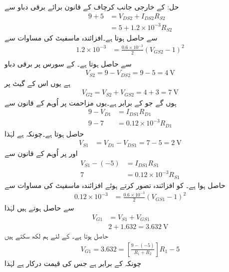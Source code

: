 حل: کے خارجی جانب کرچاف کے قانون برائے برقی دباو سے
\begin{align*}
9+5 &=V_{DS2}+I_{DS2}R_{S2}\\
&=5+1.2 \times 10^{-3} R_{S2}
\end{align*}
سے  حاصل ہوتا ہے۔افزائندہ ماسفیٹ کی مساوات سے 
\begin{align*}
1.2 \times 10^{-3}&=\frac{0.6 \times 10^{-3}}{2} \left (V_{GS2}-1 \right)^2\\
\end{align*}
سے  حاصل ہوتا ہے۔ کے سورس پر برقی دباو
\begin{align*}
V_{S2}=9-V_{DS2}=9-5=\SI{4}{\volt}
\end{align*}
ہے یوں اس کے گیٹ پر 
\begin{align*}
V_{G2}=V_{S2}+V_{GS2}=4+3=\SI{7}{\volt}
\end{align*}
ہوں گے جو  کے برابر ہے۔یوں مزاحمت  پر اُوہم کے قانون سے
\begin{align*}
9-V_{D1}&=I_{DS1} R_{D1}\\
9-7&=0.12 \times 10^{-3} R_{D1}
\end{align*}
 حاصل ہوتا ہے۔چونکہ  ہے لہٰذا
\begin{align*}
V_{S1}&=V_{D1}-V_{DS1}=7-5=\SI{2}{\volt}
\end{align*}
اور  پر اُوہم کے قانون سے
\begin{align*}
V_{S1}-(-5)&=I_{DS1} R_{S1}\\
7&=0.12 \times 10^{-3} R_{S1}
\end{align*}
 حاصل ہوا ہے۔ کو افزائندہ تصور کرتے ہوئے افزائندہ ماسفیٹ کی مساوات سے
\begin{align*}
0.12 \times 10^{-3}&=\frac{0.6 \times 10^{-3}}{2} \left (V_{GS1}-1 \right)^2
\end{align*}
سے  حاصل ہوتے ہیں لہٰذا
\begin{align*}
V_{G1}&=V_{S1}+V_{GS1}\\
&2+1.632=\SI{3.632}{\volt}
\end{align*}
حاصل ہوتا ہے۔ کے لئے ہم لکھ سکتے ہیں
\begin{align*}
V_{G1}=3.632=\left[\frac{9-(-5)}{R_1+R_2}\right] R_1 -5
\end{align*}
چونکہ  کے برابر ہے جس کی قیمت  درکار ہے لہٰذا
